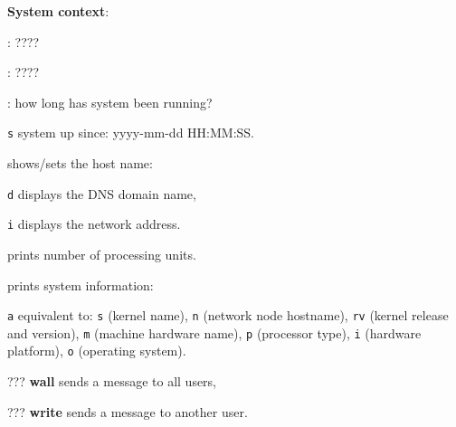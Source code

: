 \textbf{System context}:
\begin{compactenum}
	\item [\symbolcoreutils] : \dotfill ????

	\item [\symbolcoreutils] : \dotfill ????

	\item [\symbolcoreutils] : how long has system been running?
	\item [\texttt{s}] system up since: yyyy-mm-dd HH:MM:SS.

	\item [\symbolcoreutils]  shows/sets the host name:
	\item [\texttt{d}] displays the DNS domain name,
	\item [\texttt{i}] displays the network address.

	\item [\symbolcoreutils]  prints number of processing units.

	\item [\symbolcoreutils]  prints system information:
	\item [\texttt{a}] equivalent to:
	\texttt{s} (kernel name),
	\texttt{n} (network node hostname),
	\texttt{rv} (kernel release and version),
	\texttt{m} (machine hardware name),
	\texttt{p} (processor type),
	\texttt{i} (hardware platform),
	\texttt{o} (operating system).
\end{compactenum}

\begin{compactenum}
	\item [???] \textbf{wall} sends a message to all users,
	\item [???] \textbf{write} sends a message to another user. 
\end{compactenum}


